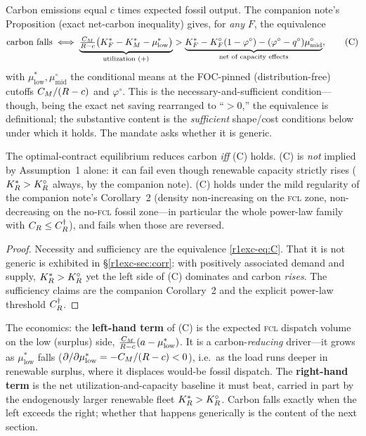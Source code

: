 Carbon emissions equal $c$ times expected fossil output. The companion note's
Proposition (exact net-carbon inequality) gives, for \emph{any} $F$, the equivalence
\begin{equation}\label{r1exc-eq:C}
  \text{carbon falls}
  \iff
  \underbrace{\tfrac{C_M}{R-c}\big(K_F^{*}-K_M^{*}-\mu^{*}_{\mathrm{low}}\big)}_{\text{utilization }(+)}
  >
  \underbrace{K_F^{*}-K_F^{\circ}(1-\varphi^{\circ})-(\varphi^{\circ}-q^{\circ})\mu^{\circ}_{\mathrm{mid}}}_{\text{net of capacity effects}},
  \tag{C}
\end{equation}
with $\mu^{*}_{\mathrm{low}},\mu^{\circ}_{\mathrm{mid}}$ the conditional means at
the FOC-pinned (distribution-free) cutoffs $C_M/(R-c)$ and $\varphi^{\circ}$. This
is the necessary-and-sufficient condition---though, being the exact net saving rearranged
to ``$>0$,'' the equivalence is definitional; the substantive content is the \emph{sufficient}
shape/cost conditions below under which it holds. The mandate asks whether it is generic.

\begin{theorem}\label{r1exc-thm:ns}
The optimal-contract equilibrium reduces carbon \emph{iff} \textup{(C)} holds.
\textup{(C)} is \emph{not} implied by Assumption~1 alone: it can fail even though
renewable capacity strictly rises ($K_R^{*}>K_R^{\circ}$ always, by the companion note).
\textup{(C)} holds under the mild regularity of the companion note's
Corollary~2 (density non-increasing on the \textsc{fcl} zone, non-decreasing on
the no-\textsc{fcl} fossil zone---in particular the whole power-law family with
$C_R\le C_R^{\dagger}$), and fails when those are reversed.
\end{theorem}

\begin{proof}
Necessity and sufficiency are the equivalence \eqref{r1exc-eq:C}. That it is not generic
is exhibited in \S\ref{r1exc-sec:corr}: with positively associated demand and supply,
$K_R^{*}>K_R^{\circ}$ yet the left side of (C) dominates and carbon \emph{rises}. The
sufficiency claims are the companion Corollary~2 and the explicit power-law
threshold $C_R^{\dagger}$.
\end{proof}

The economics: the \textbf{left-hand term} of (C) is the expected \textsc{fcl}
dispatch volume on the low (surplus) side, $\tfrac{C_M}{R-c}(a-\mu^{*}_{\mathrm{low}})$.
It is a carbon-\emph{reducing} driver---it grows as $\mu^{*}_{\mathrm{low}}$ falls
($\partial/\partial\mu^{*}_{\mathrm{low}}=-C_M/(R-c)<0$), i.e.\ as the load runs deeper in
renewable surplus, where it displaces would-be fossil dispatch. The \textbf{right-hand
term} is the net utilization-and-capacity baseline it must beat, carried in part by the
endogenously larger renewable fleet $K_R^{*}>K_R^{\circ}$. Carbon falls exactly when the left
exceeds the right; whether that happens generically is the content of the next section.

